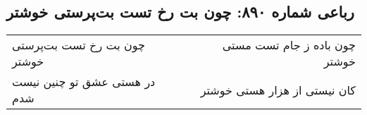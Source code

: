 \begin{center}
\section*{رباعی شماره ۸۹۰: چون بت رخ تست بت‌پرستی خوشتر}
\label{sec:0890}
\begin{longtable}{l p{0.5cm} r}
چون بت رخ تست بت‌پرستی خوشتر
&&
چون باده ز جام تست مستی خوشتر
\\
در هستی عشق تو چنین نیست شدم
&&
کان نیستی از هزار هستی خوشتر
\\
\end{longtable}
\end{center}
